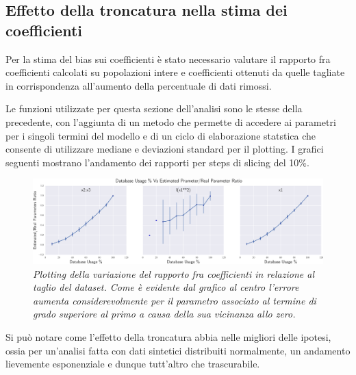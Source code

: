 \documentclass[a4paper]{report}
\begin{document}
\subsection{Effetto della troncatura nella stima dei coefficienti }

Per la stima del bias sui coefficienti è stato necessario valutare il rapporto fra coefficienti calcolati su popolazioni intere e coefficienti ottenuti da quelle  tagliate in corrispondenza all'aumento della percentuale di dati rimossi.

 Le funzioni utilizzate per questa sezione dell'analisi sono le stesse della precedente, con l'aggiunta di un metodo che permette di accedere ai parametri per i singoli termini del modello e di un ciclo di elaborazione statstica che consente  di utilizzare mediane e deviazioni standard per il plotting.
I grafici seguenti mostrano l'andamento dei rapporti per steps di slicing del 10\%.

\begin{figure}[hbtp]
\includegraphics[width=\textwidth]{finalgraph}
\caption{\textit{Plotting della variazione del rapporto fra coefficienti in relazione al taglio del dataset. Come è evidente dal grafico al centro l'errore aumenta considerevolmente per il parametro associato al termine di grado superiore al primo a causa della sua vicinanza allo zero.}}
\end{figure}


Si può notare come l'effetto della troncatura abbia nelle migliori delle ipotesi, ossia per un'analisi fatta con dati sintetici distribuiti normalmente, un andamento lievemente esponenziale e dunque tutt'altro che trascurabile.
\end{document}
